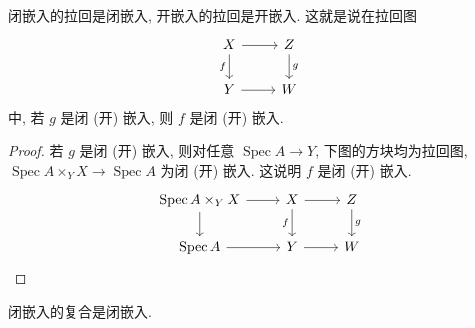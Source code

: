 \documentclass{book}
\newcommand{\todo}[1]{{\color{blue}\fbox{TODO: \textbf{#1}}}}
\begin{document}
	\begin{prop}[label={closed-open-stable-base-change}]
		{}
		闭嵌入的拉回是闭嵌入, 开嵌入的拉回是开嵌入. 这就是说在拉回图
		\[\begin{tikzcd}[ampersand replacement=\&]
			X \& Z \\
			Y \& W
			\arrow[from=1-1, to=1-2]
			\arrow["f"', from=1-1, to=2-1]
			\arrow["g", from=1-2, to=2-2]
			\arrow[from=2-1, to=2-2]
		\end{tikzcd}\]
		中, 若 $g$ 是闭 (开) 嵌入, 则 $f$ 是闭 (开) 嵌入.
	\end{prop}
	\begin{proof}
		若 $g$ 是闭 (开) 嵌入, 则对任意 $\operatorname{Spec} A\to Y$, 下图的方块均为拉回图, $\operatorname{Spec} A\times_Y X\to \operatorname{Spec} A$ 为闭 (开) 嵌入. 这说明 $f$ 是闭 (开) 嵌入.
		\[\begin{tikzcd}[ampersand replacement=\&]
			{\operatorname{Spec} A\times_Y X} \& X \& Z \\
			{\operatorname{Spec} A} \& Y \& W
			\arrow[from=1-1, to=1-2]
			\arrow[from=1-1, to=2-1]
			\arrow[from=1-2, to=1-3]
			\arrow["f"', from=1-2, to=2-2]
			\arrow["g", from=1-3, to=2-3]
			\arrow[from=2-1, to=2-2]
			\arrow[from=2-2, to=2-3]
		\end{tikzcd}\]
		
	\end{proof}
	
	
	\begin{prop}
		{}
		闭嵌入的复合是闭嵌入.
	\end{prop}
	
\end{document}
